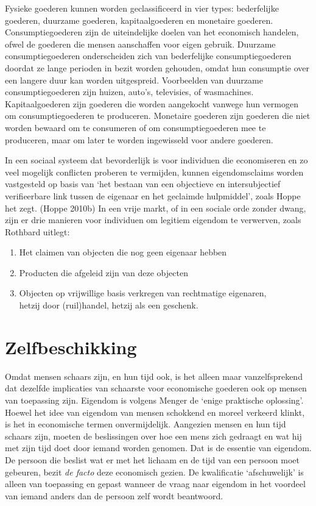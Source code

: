 \documentclass[
  a5paper,
  smalldemyvopaper,11pt,twoside,onecolumn,openright,extrafontsizes,
hidelinks]{memoir}
\begin{document}
Fysieke goederen kunnen worden geclassificeerd in vier types:
bederfelijke goederen, duurzame goederen, kapitaalgoederen en monetaire
goederen. Consumptiegoederen zijn de uiteindelijke doelen van het
economisch handelen, ofwel de goederen die mensen aanschaffen voor eigen
gebruik. Duurzame consumptiegoederen onderscheiden zich van bederfelijke
consumptiegoederen doordat ze lange perioden in bezit worden gehouden,
omdat hun consumptie over een langere duur kan worden uitgespreid.
Voorbeelden van duurzame consumptiegoederen zijn huizen, auto's,
televisies, of wasmachines. Kapitaalgoederen zijn goederen die worden
aangekocht vanwege hun vermogen om consumptiegoederen te produceren.
Monetaire goederen zijn goederen die niet worden bewaard om te
consumeren of om consumptiegoederen mee te produceren, maar om later te
worden ingewisseld voor andere goederen.

In een sociaal systeem dat bevorderlijk is voor individuen die
economiseren en zo veel mogelijk conflicten proberen te vermijden,
kunnen eigendomsclaims worden vastgesteld op basis van `het bestaan van
een objectieve en intersubjectief verifieerbare link tussen de eigenaar
en het geclaimde hulpmiddel', zoals Hoppe het zegt. (Hoppe 2010b) In een
vrije markt, of in een sociale orde zonder dwang, zijn er drie manieren
voor individuen om legitiem eigendom te verwerven, zoals Rothbard
uitlegt:

\begin{enumerate}
\def\labelenumi{\arabic{enumi}.}
\item
  Het claimen van objecten die nog geen eigenaar hebben
\item
  Producten die afgeleid zijn van deze objecten
\item
  Objecten op vrijwillige basis verkregen van rechtmatige eigenaren,\\
  hetzij door (ruil)handel, hetzij als een geschenk.
\end{enumerate}

\section{Zelfbeschikking}\label{zelfbeschikking}

Omdat mensen schaars zijn, en hun tijd ook, is het alleen maar
vanzelfsprekend dat dezelfde implicaties van schaarste voor economische
goederen ook op mensen van toepassing zijn. Eigendom is volgens Menger
de `enige praktische oplossing'. Hoewel het idee van eigendom van mensen
schokkend en moreel verkeerd klinkt, is het in economische termen
onvermijdelijk. Aangezien mensen en hun tijd schaars zijn, moeten de
beslissingen over hoe een mens zich gedraagt en wat hij met zijn tijd
doet door iemand worden genomen. Dat is de essentie van eigendom. De
persoon die beslist wat er met het lichaam en de tijd van een persoon
moet gebeuren, bezit \emph{de facto} deze economisch gezien. De
kwalificatie `afschuwelijk' is alleen van toepassing en gepast wanneer
de vraag naar eigendom in het voordeel van iemand anders dan de persoon
zelf wordt beantwoord.
\end{document}
